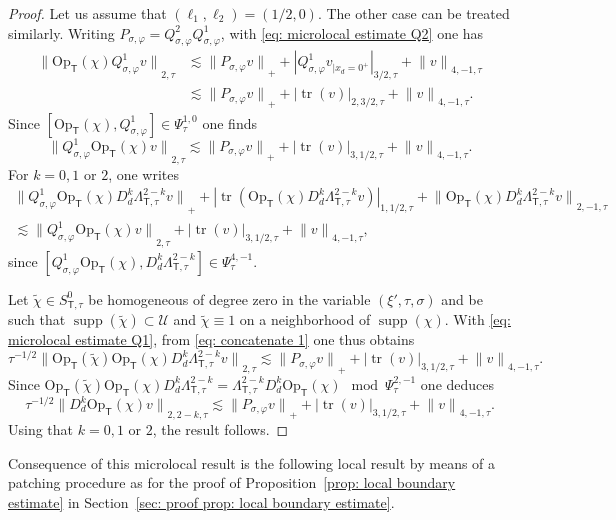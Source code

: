 \documentclass[10pt]{amsart}
\theoremstyle{plain}
\theoremstyle{definition}
\newcommand{\nhd}{neighborhood\xspace}
\newcommand{\tchi}{\tilde{\chi}}
\newcommand{\U}{\mathscr U}
\newcommand{\br}{\ensuremath{_{|x_d=0^+}}}
\newcommand{\Opt}{\ensuremath{\mathrm{Op}_{\scriptscriptstyle{\mathsf{T}}}}}
\newcommand{\Norm}[2]{{\| #1 \|}_{#2}}
\newcommand{\Normsc}[2]{{\| #1 \|}_{#2, \tau}}
\newcommand{\normsc}[2]{{| #1 |}_{#2, \tau}}
\newcommand{\Lsct}{\Lambda_{{\scriptscriptstyle{\mathsf T}},\tau}}
\newcommand{\Psisc}{\Psi_\tau}
\newcommand{\Ssct}{S_{{\scriptscriptstyle{\mathsf T}},\tau}}
\newcommand{\Pconj}{P_{\sigma,\varphi}}
\newcommand{\Qconj}{Q_{\sigma,\varphi}}
\DeclareMathOperator{\supp}{supp}
\DeclareMathOperator{\trace}{tr}
\begin{document}
\begin{proof}
Let us assume that $(\ell_1,\ell_2) = (1/2,0)$. The other case can be
treated similarly. Writing $\Pconj =\Qconj^2 \Qconj^1$, with \eqref{eq: microlocal estimate Q2} one has
\begin{align*}
\Normsc{\Opt (\chi) \Qconj^1 v}{2}
&\lesssim
\Norm{ \Pconj v}{+}
+\normsc{\Qconj^1 v\br}{3/2}
+\Normsc{v}{4,-1}\\
&\lesssim
\Norm{\Pconj v}{+}
+\normsc{\trace (v)}{2,3/2}
+\Normsc{v}{4,-1}.
\end{align*}
Since $[\Opt (\chi), \Qconj^1 ] \in \Psisc^{1,0}$ one finds
\begin{equation}
\label{eq: concatenate 1}
\Normsc{\Qconj^1 \Opt (\chi) v}{2}
\lesssim
\Norm{\Pconj v }{+}
+\normsc{\trace (v)}{3,1/2}
+\Normsc{v}{4,-1}.
\end{equation}
For $k=0,1$ or $2$, one writes
\begin{multline*}
\Norm{\Qconj^1 \Opt (\chi) D_d^k \Lsct^{2-k} v}{+}
+ \normsc{\trace (\Opt (\chi) D_d^k \Lsct^{2-k} v)}{1,1/2}
+ \Normsc{\Opt (\chi) D_d^k \Lsct^{2-k} v}{2,-1}\\
\lesssim
\Normsc{\Qconj^1 \Opt (\chi) v}{2}
+ \normsc{\trace (v)}{3,1/2}
+ \Normsc{v}{4,-1},
\end{multline*}
since $[\Qconj^1 \Opt (\chi), D_d^k\Lsct^{2-k} ] \in \Psisc^{4,-1}$.

Let $\tchi\in \Ssct^0$ be homogeneous of degree zero
in the variable $(\xi',\tau,\sigma)$ and be such that
$\supp(\tchi)\subset\U$ and
$\tchi\equiv 1$ on a \nhd of $\supp(\chi)$.
With \eqref{eq: microlocal estimate Q1}, from \eqref{eq: concatenate
1} one thus obtains
\begin{equation*}
\tau^{-1/2}\Normsc{\Opt(\tchi)\Opt (\chi) D_d^k\Lsct^{2-k} v}{2}
\lesssim
\Norm{\Pconj v }{+}
+\normsc{\trace (v)}{3,1/2}
+\Normsc{v}{4,-1}.
\end{equation*}
Since $\Opt(\tchi)\Opt (\chi) D_d^k\Lsct^{2-k} =\Lsct^{2-k} D_d^k \Opt (\chi) \mod
\Psisc^{2,-1}$ one deduces
\begin{equation*}
\tau^{-1/2}\Normsc{D_d^k\Opt (\chi) v}{2,2-k}
\lesssim
\Norm{\Pconj v}{+}
+\normsc{\trace (v)}{3,1/2}
+\Normsc{v}{4,-1}.
\end{equation*}
Using that $k=0,1$ or $2$, the result follows.
\end{proof}

Consequence of this microlocal result is the following local result
by means of a patching procedure as for the proof of
Proposition~\ref{prop: local boundary estimate} in Section~\ref{sec: proof prop: local boundary estimate}.
\end{document}
